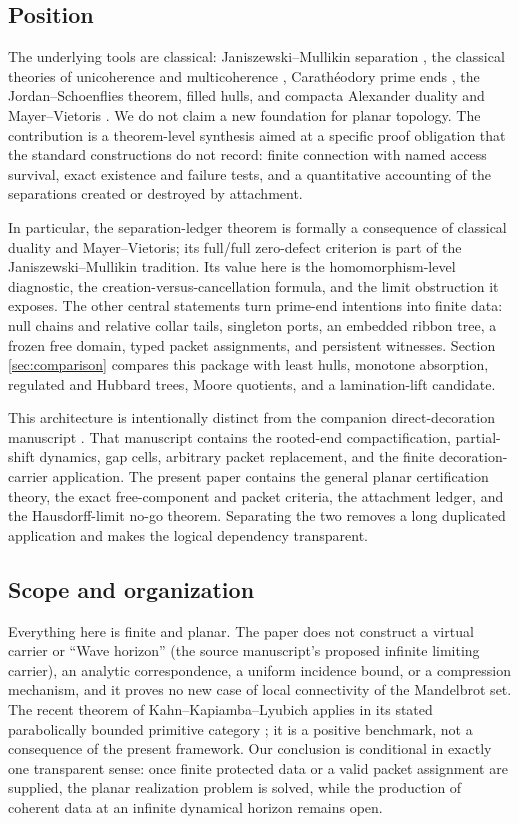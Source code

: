 \subsection{Position}

The underlying tools are classical: Janiszewski--\allowbreak Mullikin separation
\cite{Jan15,Mul22,New51,Why42}, the classical theories of unicoherence and
multicoherence \cite{Bor31,Eil36}, Carath\'eodory prime ends \cite{Pom92}, the
Jordan--Schoenflies theorem, filled hulls, and compacta Alexander duality and
Mayer--Vietoris \cite[Chapter~6]{Spa66}.  We do not claim a new foundation
for planar topology.  The contribution is a theorem-level synthesis aimed
at a specific proof obligation that the standard constructions do not
record: finite connection with named access survival, exact existence and
failure tests, and a quantitative accounting of the separations created or
destroyed by attachment.

In particular, the separation-ledger theorem is formally a consequence of
classical duality and Mayer--Vietoris; its full/full zero-defect criterion
is part of the Janiszewski--Mullikin tradition.  Its value here is the
homomorphism-level diagnostic, the creation-versus-cancellation formula,
and the limit obstruction it exposes.  The other central statements
turn prime-end intentions into finite data: null chains and relative
collar tails, singleton ports, an embedded ribbon tree, a frozen free domain,
typed packet assignments, and persistent witnesses.  Section
\ref{sec:comparison} compares this package with least hulls, monotone
absorption, regulated and Hubbard trees, Moore quotients, and a
lamination-lift candidate.

This architecture is intentionally distinct from the companion
direct-decoration manuscript \cite{Wes26}.  That manuscript contains the rooted-end
compactification, partial-shift dynamics, gap cells, arbitrary packet
replacement, and the finite decoration-carrier application.  The present
paper contains the general planar certification theory, the exact
free-component and packet criteria, the attachment ledger, and the
Hausdorff-limit no-go theorem.  Separating the two removes a long duplicated
application and makes the logical dependency transparent.

\subsection{Scope and organization}

Everything here is finite and planar.  The paper does not construct a
virtual carrier or ``Wave horizon'' (the source manuscript's proposed
infinite limiting carrier), an analytic correspondence, a uniform
incidence bound, or a compression mechanism, and it proves no new case of
local connectivity of the Mandelbrot set.  The recent theorem of
Kahn--Kapiamba--Lyubich applies in its stated parabolically bounded primitive
category \cite{KKL26}; it is a positive benchmark, not a consequence of the
present framework.  Our conclusion is conditional in exactly one transparent
sense: once finite protected data or a valid packet assignment are supplied,
the planar realization problem is solved, while the production of coherent
data at an infinite dynamical horizon remains open.

